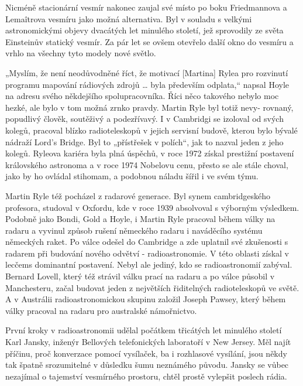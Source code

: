   Nicméně stacionární vesmír nakonec zaujal své místo po boku Friedmannova a Lemaîtrova vesmíru jako
  možná alternativa. Byl v souladu s velkými astronomickými objevy dvacátých let minulého století,
  jež sprovodily ze světa Einsteinův statický vesmír. Za pár let se ovšem otevřelo další okno do
  vesmíru a vrhlo na všechny tyto modely nové světlo. 

  „Myslím, že není neodůvodněné říct, že motivací [Martina] Rylea pro rozvinutí programu mapování
  rádiových zdrojů … byla především odplata,“ napsal Hoyle na adresu svého někdejšího
  spolupracovníka. Říci něco takového nebylo moc hezké, ale bylo v tom možná zrnko pravdy. Martin
  Ryle byl totiž nevy- rovnaný, popudlivý člověk, soutěživý a podezřívavý. I v Cambridgi se izoloval
  od svých kolegů, pracoval blízko radioteleskopů v jejich servisní budově, kterou bylo bývalé
  nádraží Lord’s Bridge. Byl to „přístřešek v polích“, jak to nazval jeden z jeho kolegů. Ryleova
  kariéra byla plná úspěchů, v roce 1972 získal prestižní postavení královského astronoma a v roce
  1974 Nobelovu cenu, přesto se ale stále choval, jako by ho ovládal stihomam, a podobnou náladu
  šířil i ve svém týmu. 

  Martin Ryle též pocházel z radarové generace. Byl synem cambridgeského profesora, studoval v
  Oxfordu, kde v roce 1939 absolvoval s výborným výsledkem. Podobně jako Bondi, Gold a Hoyle, i
  Martin Ryle pracoval během války na radaru a vyvinul způsob rušení německého radaru i naváděcího
  systému německých raket. Po válce odešel do Cambridge a zde uplatnil své zkušenosti s radarem při
  budování nového odvětví - radioastronomie. V této oblasti získal v lecčems dominantní postavení.
  Nebyl ale jediný, kdo se radioastronomií zabýval. Bernard Lovell, který též strávil válku prací na
  radaru a po válce působil v Manchesteru, začal budovat jeden z největších řiditelných
  radioteleskopů ve světě. A v Austrálii radioastronomickou skupinu založil Joseph Pawsey, který
  během války pracoval na radaru pro australské námořnictvo. 

  První kroky v radioastronomii udělal počátkem třicátých let minulého století Karl Jansky, inženýr
  Bellových telefonických laboratoří v New Jersey. Měl najít příčinu, proč konverzace pomocí
  vysílaček, ba i rozhlasové vysílání, jsou někdy tak špatně srozumitelné v důsledku šumu neznámého
  původu. Jansky se vůbec nezajímal o tajemství vesmírného prostoru, chtěl prostě vylepšit poslech
  rádia. 

